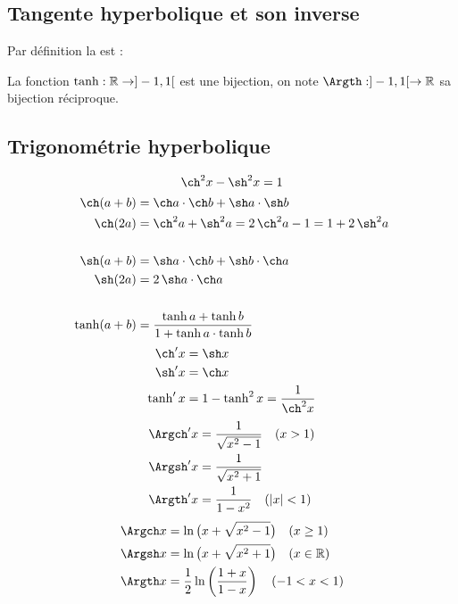 \documentclass[class=report,crop=false]{standalone}
\begin{document}
\subsection{Tangente hyperbolique et son inverse}


Par définition la  est :

La fonction $\tanh : \mathbb{R} \to ]-1,1[$ est une bijection, on note
$\Argth : ]-1,1[\to\Rr$ sa bijection réciproque.




\subsection{Trigonométrie hyperbolique}

$$\ch^2 x - \sh^2 x = 1$$
\begin{align*}
\ch(a+b)&=\ch a\cdot\ch b + \sh a\cdot\sh b\\
\ch(2a) &=\ch^2a+\sh^2a = 2\,\ch^2a-1 = 1+2\,\sh^2a\\  \\
\sh(a+b)&=\sh a\cdot\ch b  +  \sh b\cdot\ch a\\
\sh(2a) &= 2\,\sh a\cdot\ch a\\ \\
\tanh (a+b)&=\frac{\tanh a + \tanh b}{1+\tanh a\cdot\tanh b}\\
\end{align*}
\begin{align*}
\ch'x&= \sh x\\
\sh'x&=\ch x\\
\tanh' x &= 1-\tanh^2x=\frac{1}{\ch^2x}\\
\end{align*}
\begin{align*}
\Argch'x&=\frac{1}{\sqrt{x^2-1}} \quad (x>1)\\
\Argsh'x&=\frac{1}{\sqrt{x^2+1}} \\
\Argth'x&=\frac{1}{1-x^2} \quad (|x|<1)\\
\end{align*}
\begin{align*}
\Argch x&= \ln\big(x+ \sqrt{x^2-1}\big) \quad (x\ge1)\\
\Argsh x&= \ln\big(x+ \sqrt{x^2+1}\big)  \quad (x \in \Rr) \\
\Argth x&= \frac12\ln\left(\frac{1+x}{1-x}\right) \quad (-1<x<1) \\
\end{align*}
\end{document}
